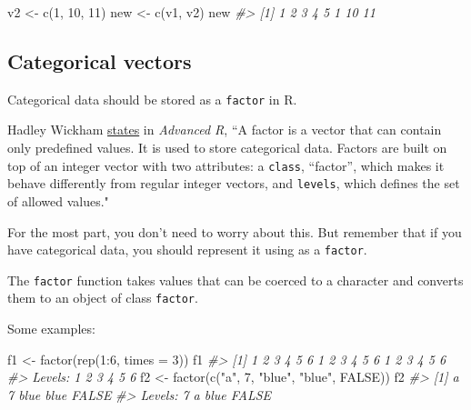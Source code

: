 \documentclass[
]{article}
\newenvironment{Shaded}{\begin{snugshade}}{\end{snugshade}}
\newcommand{\AttributeTok}[1]{\textcolor[rgb]{0.77,0.63,0.00}{#1}}
\newcommand{\CommentTok}[1]{\textcolor[rgb]{0.56,0.35,0.01}{\textit{#1}}}
\newcommand{\ConstantTok}[1]{\textcolor[rgb]{0.00,0.00,0.00}{#1}}
\newcommand{\DecValTok}[1]{\textcolor[rgb]{0.00,0.00,0.81}{#1}}
\newcommand{\FunctionTok}[1]{\textcolor[rgb]{0.00,0.00,0.00}{#1}}
\newcommand{\NormalTok}[1]{#1}
\newcommand{\OtherTok}[1]{\textcolor[rgb]{0.56,0.35,0.01}{#1}}
\newcommand{\SpecialCharTok}[1]{\textcolor[rgb]{0.00,0.00,0.00}{#1}}
\newcommand{\StringTok}[1]{\textcolor[rgb]{0.31,0.60,0.02}{#1}}
\begin{document}
\begin{Shaded}
\begin{Highlighting}[]
\NormalTok{v2 }\OtherTok{\textless{}{-}} \FunctionTok{c}\NormalTok{(}\DecValTok{1}\NormalTok{, }\DecValTok{10}\NormalTok{, }\DecValTok{11}\NormalTok{)}
\NormalTok{new }\OtherTok{\textless{}{-}} \FunctionTok{c}\NormalTok{(v1, v2)}
\NormalTok{new}
\CommentTok{\#\textgreater{} [1]  1  2  3  4  5  1 10 11}
\end{Highlighting}
\end{Shaded}

\hypertarget{categorical-vectors}{%
\subsection{Categorical vectors}\label{categorical-vectors}}

Categorical data should be stored as a \texttt{factor} in R.

Hadley Wickham \href{https://adv-r.hadley.nz/vectors-chap.html}{states}
in \emph{Advanced R}, ``A factor is a vector that can contain only
predefined values. It is used to store categorical data. Factors are
built on top of an integer vector with two attributes: a \texttt{class},
``factor'', which makes it behave differently from regular integer
vectors, and \texttt{levels}, which defines the set of allowed values."

For the most part, you don't need to worry about this. But remember that
if you have categorical data, you should represent it using as a
\texttt{factor}.

The \texttt{factor} function takes values that can be coerced to a
character and converts them to an object of class \texttt{factor}.

Some examples:

\begin{Shaded}
\begin{Highlighting}[]
\NormalTok{f1 }\OtherTok{\textless{}{-}} \FunctionTok{factor}\NormalTok{(}\FunctionTok{rep}\NormalTok{(}\DecValTok{1}\SpecialCharTok{:}\DecValTok{6}\NormalTok{, }\AttributeTok{times =} \DecValTok{3}\NormalTok{))}
\NormalTok{f1}
\CommentTok{\#\textgreater{}  [1] 1 2 3 4 5 6 1 2 3 4 5 6 1 2 3 4 5 6}
\CommentTok{\#\textgreater{} Levels: 1 2 3 4 5 6}
\NormalTok{f2 }\OtherTok{\textless{}{-}} \FunctionTok{factor}\NormalTok{(}\FunctionTok{c}\NormalTok{(}\StringTok{"a"}\NormalTok{, }\DecValTok{7}\NormalTok{, }\StringTok{"blue"}\NormalTok{, }\StringTok{"blue"}\NormalTok{, }\ConstantTok{FALSE}\NormalTok{))}
\NormalTok{f2}
\CommentTok{\#\textgreater{} [1] a     7     blue  blue  FALSE}
\CommentTok{\#\textgreater{} Levels: 7 a blue FALSE}
\end{Highlighting}
\end{Shaded}
\end{document}
